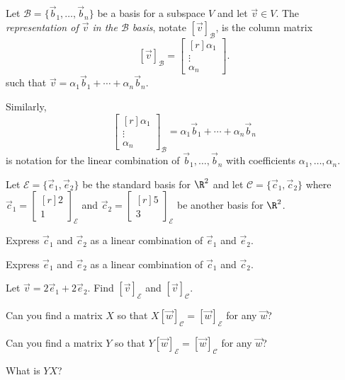 \documentclass{problemset}
\newcommand{\mat}[1]{\begin{bmatrix*}[r]#1\end{bmatrix*}}
\begin{document}
	\begin{definition}
		Let $\mathcal B=\{\vec b_1,\ldots,\vec b_n\}$ be a basis for a subspace $V$
		and let $\vec v\in V$. The \emph{representation of $\vec v$ in the $\mathcal B$
		basis}, notate $[\vec v]_{\mathcal B}$,
		is the column matrix
		\[
			[\vec v]_{\mathcal B} = \mat{\alpha_1\\\vdots\\\alpha_n}.
		\]
		such that $
			\vec v=\alpha_1\vec b_1+\cdots+\alpha_n\vec b_n.
		$

		Similarly,
		\[
			\mat{\alpha_1\\\vdots\\\alpha_n}_{\mathcal B} = \alpha_1\vec b_1+\cdots +\alpha_n\vec b_n
		\]
		is notation for the linear combination of $\vec b_1,\ldots,\vec b_n$ with coefficients $\alpha_1,\ldots,\alpha_n$.
	\end{definition}

	\question
	Let $\mathcal E=\{\vec e_1,\vec e_2\}$ be the standard basis for $\R^2$ and let 
	$\mathcal C=\{\vec c_1,\vec c_2\}$ where $\vec c_1=\mat{2\\1}_{\mathcal E}$ and $\vec c_2=\mat{5\\3}_{\mathcal E}$
	be another basis for $\R^2$.
	\begin{parts}
		\item Express $\vec c_1$ and $\vec c_2$ as a linear combination of $\vec e_1$ and $\vec e_2$.
		\item Express $\vec e_1$ and $\vec e_2$ as a linear combination of $\vec c_1$ and $\vec c_2$.
		\item Let $\vec v=2\vec e_1+2\vec e_2$. Find $[\vec v]_{\mathcal E}$ and $[\vec v]_{\mathcal C}$.
		\item Can you find a matrix $X$ so that $X[\vec w]_{\mathcal C} = [\vec w]_{\mathcal E}$ for any
			$\vec w$?
		\item Can you find a matrix $Y$ so that $Y[\vec w]_{\mathcal E} = [\vec w]_{\mathcal C}$ for any
			$\vec w$?
		\item What is $YX$?
	\end{parts}
\end{document}
